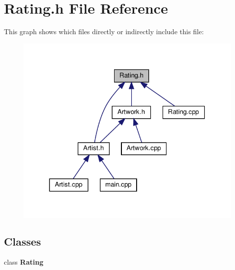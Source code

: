 \section{Rating.\+h File Reference}
\label{_rating_8h}
This graph shows which files directly or indirectly include this file\+:\nopagebreak
\begin{figure}[H]
\begin{center}
\leavevmode
\includegraphics[width=318pt]{_rating_8h__dep__incl}
\end{center}
\end{figure}
\subsection*{Classes}
\begin{DoxyCompactItemize}
\item 
class \textbf{ Rating}
\end{DoxyCompactItemize}
